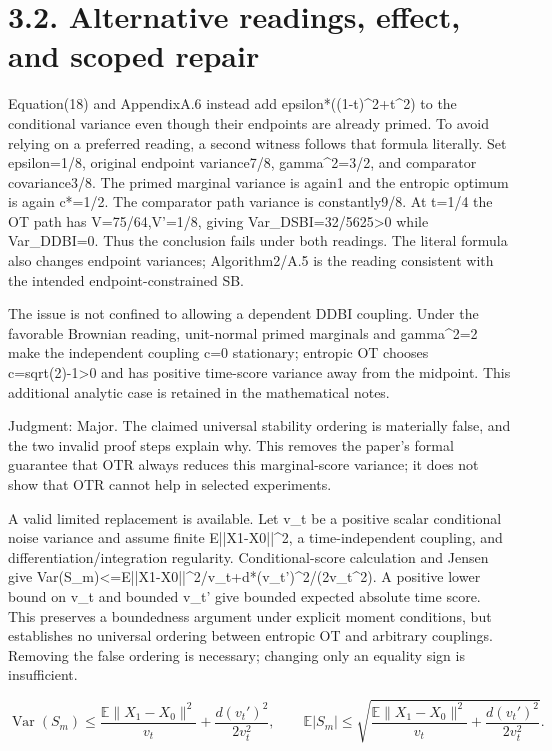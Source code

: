 \documentclass[10pt]{article}
\begin{document}
\section*{3.2. Alternative readings, effect, and scoped repair}
Equation(18) and AppendixA.6 instead add epsilon*((1-t)\textasciicircum{}2+t\textasciicircum{}2) to the conditional variance even though their endpoints are already primed. To avoid relying on a preferred reading, a second witness follows that formula literally. Set epsilon=1/8, original endpoint variance7/8, gamma\textasciicircum{}2=3/2, and comparator covariance3/8. The primed marginal variance is again1 and the entropic optimum is again c*=1/2. The comparator path variance is constantly9/8. At t=1/4 the OT path has V=75/64,V’=1/8, giving Var\_DSBI=32/5625>0 while Var\_DDBI=0. Thus the conclusion fails under both readings. The literal formula also changes endpoint variances; Algorithm2/A.5 is the reading consistent with the intended endpoint-constrained SB.\par
The issue is not confined to allowing a dependent DDBI coupling. Under the favorable Brownian reading, unit-normal primed marginals and gamma\textasciicircum{}2=2 make the independent coupling c=0 stationary; entropic OT chooses c=sqrt(2)-1>0 and has positive time-score variance away from the midpoint. This additional analytic case is retained in the mathematical notes.\par
Judgment: Major. The claimed universal stability ordering is materially false, and the two invalid proof steps explain why. This removes the paper’s formal guarantee that OTR always reduces this marginal-score variance; it does not show that OTR cannot help in selected experiments.\par
A valid limited replacement is available. Let v\_t be a positive scalar conditional noise variance and assume finite E||X1-X0||\textasciicircum{}2, a time-independent coupling, and differentiation/integration regularity. Conditional-score calculation and Jensen give Var(S\_m)<=E||X1-X0||\textasciicircum{}2/v\_t+d*(v\_t’)\textasciicircum{}2/(2v\_t\textasciicircum{}2). A positive lower bound on v\_t and bounded v\_t’ give bounded expected absolute time score. This preserves a boundedness argument under explicit moment conditions, but establishes no universal ordering between entropic OT and arbitrary couplings. Removing the false ordering is necessary; changing only an equality sign is insufficient.\par
\[\operatorname{Var}(S_m)\leq\frac{\mathbb E\|X_1-X_0\|^2}{v_t}+\frac{d(v_t')^2}{2v_t^2},\qquad \mathbb E|S_m|\leq\sqrt{\frac{\mathbb E\|X_1-X_0\|^2}{v_t}+\frac{d(v_t')^2}{2v_t^2}}.\]\par
\end{document}
